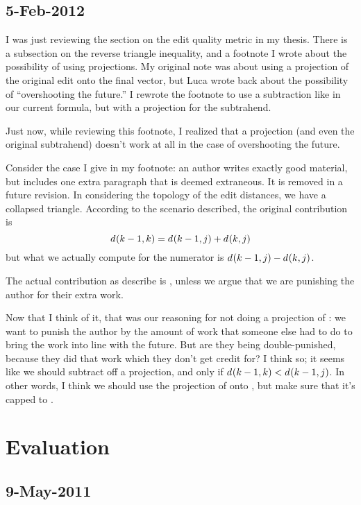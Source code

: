 \subsection{5-Feb-2012}

I was just reviewing the section on the edit quality metric in my thesis.
There is a subsection on the reverse triangle inequality, and a footnote
I wrote about the possibility of using projections.
My original note was about using a projection of the original edit onto
the final vector, but Luca wrote back about the possibility of
``overshooting the future.''
I rewrote the footnote to use a subtraction like in our current formula,
but with a projection for the subtrahend.

Just now, while reviewing this footnote, I realized that a projection
(and even the original subtrahend) doesn't work at all in the case of
overshooting the future.

Consider the case I give in my footnote: an author writes exactly good
material, but includes one extra paragraph that is deemed extraneous.
It is removed in a future revision.
In considering the topology of the edit distances, we have a collapsed
triangle.
According to the scenario described, the original contribution is
\begin{equation}
d_{}(k-1,k) = d_{}(k-1,j) + d_{}(k,j)
\end{equation}
but what we actually compute for the numerator is
$d_{}(k-1,j) - d_{}(k,j)$.

The actual contribution as describe is ,
unless we argue that we are punishing the author for their extra work.

Now that I think of it, that was our reasoning for not doing a
projection of : we want to punish the author by the amount
of work that someone else had to do to bring the work into line with the
future.
But are they being double-punished, because they did that work which
they don't get credit for?
I think so; it seems like we should subtract off a projection, and only
if $d_{}(k-1,k) < d_{}(k-1,j)$.
In other words, I think we should use the projection of 
onto , but make sure that it's capped to .

\section{Evaluation}

\subsection{9-May-2011}

